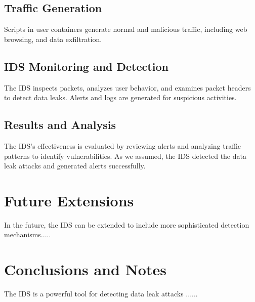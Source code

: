\documentclass{article}
\begin{document}
\subsection{Traffic Generation}
Scripts in user containers generate normal and malicious traffic, including web browsing, and data exfiltration.

\subsection{IDS Monitoring and Detection}
The IDS inspects packets, analyzes user behavior, and examines packet headers to detect data leaks. Alerts and logs are generated for suspicious activities.

\subsection{Results and Analysis}
The IDS's effectiveness is evaluated by reviewing alerts and analyzing traffic patterns to identify vulnerabilities.
As we assumed, the IDS detected the data leak attacks and generated alerts successfully.

\section{Future Extensions}
In the future, the IDS can be extended to include more sophisticated detection mechanisms.....

\section{Conclusions and Notes}
The IDS is a powerful tool for detecting data leak attacks ...... 

\appendix
\end{document}

